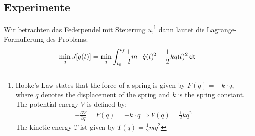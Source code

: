 \documentclass[a4paper, 12pt]{scrartcl}
\newcommand{\dt}{\thinspace \mathsf{dt}}
\begin{document}
\subsection{Experimente}

Wir betrachten das Federpendel mit Steuerung $u$,\footnote{
    Hooke's Law states that the force of a spring is given by $F(q) = - k \cdot q$, 
    where $q$ denotes the displacement of the spring and $k$ is the spring constant. 
    The potential energy $V$ is defined by:
    \begin{align*}
        - \frac{\partial V}{\partial q} = F(q) = - k \cdot q 
        \Rightarrow 
        V(q) = \frac{1}{2} k q^2 
    \end{align*}
    The kinetic energy $T$ ist given by $T(\dot{q}) = \frac{1}{2} m \dot{q}^2$
}
dann lautet die Lagrange-Formulierung des Problems:
%
\begin{align*}
    \min_{q} J[q(t)] 
    =
    \min_{q}
    \int_{t_0}^{t_f} \frac{1}{2} m \cdot \dot{q}(t)^2 - \frac{1}{2} k q(t)^2 \dt
\end{align*}
\end{document}
